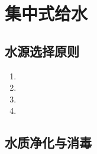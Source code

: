 \section{集中式给水}

\subsection{水源选择原则}

\begin{enumerate}[leftmargin=*]
    \item {} \item {} \item {} \item {}
\end{enumerate}

\subsection{水质净化与消毒}

